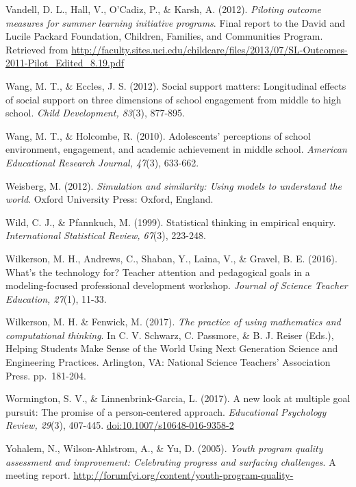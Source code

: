 \documentclass[]{book}
\theoremstyle{definition}
\theoremstyle{definition}
\theoremstyle{definition}
\theoremstyle{remark}
\begin{document}
Vandell, D. L., Hall, V., O'Cadiz, P., \& Karsh, A. (2012).
\emph{Piloting outcome measures for summer learning initiative
programs}. Final report to the David and Lucile Packard Foundation,
Children, Families, and Communities Program. Retrieved from
\url{http://faculty.sites.uci.edu/childcare/files/2013/07/SL-Outcomes-2011-Pilot_Edited_8.19.pdf}

Wang, M. T., \& Eccles, J. S. (2012). Social support matters:
Longitudinal effects of social support on three dimensions of school
engagement from middle to high school. \emph{Child Development, 83}(3),
877-895.

Wang, M. T., \& Holcombe, R. (2010). Adolescents' perceptions of school
environment, engagement, and academic achievement in middle school.
\emph{American Educational Research Journal, 47}(3), 633-662.

Weisberg, M. (2012). \emph{Simulation and similarity: Using models to
understand the world}. Oxford University Press: Oxford, England.

Wild, C. J., \& Pfannkuch, M. (1999). Statistical thinking in empirical
enquiry. \emph{International Statistical Review, 67}(3), 223-248.

Wilkerson, M. H., Andrews, C., Shaban, Y., Laina, V., \& Gravel, B. E.
(2016). What's the technology for? Teacher attention and pedagogical
goals in a modeling-focused professional development workshop.
\emph{Journal of Science Teacher Education, 27}(1), 11-33.

Wilkerson, M. H. \& Fenwick, M. (2017). \emph{The practice of using
mathematics and computational thinking}. In C. V. Schwarz, C. Passmore,
\& B. J. Reiser (Eds.), Helping Students Make Sense of the World Using
Next Generation Science and Engineering Practices. Arlington, VA:
National Science Teachers' Association Press. pp.~181-204.

Wormington, S. V., \& Linnenbrink-Garcia, L. (2017). A new look at
multiple goal pursuit: The promise of a person-centered approach.
\emph{Educational Psychology Review, 29}(3), 407-445.
\url{doi:10.1007/s10648-016-9358-2}

Yohalem, N., Wilson-Ahlstrom, A., \& Yu, D. (2005). \emph{Youth program
quality assessment and improvement: Celebrating progress and surfacing
challenges}. A meeting report.
\url{http://forumfyi.org/content/youth-program-quality-}


\end{document}
